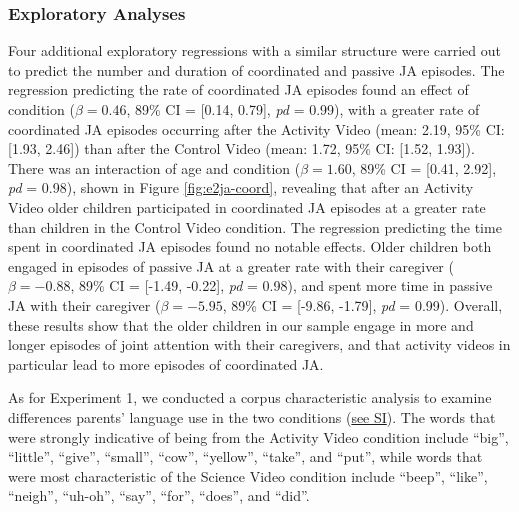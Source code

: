 \documentclass[
  english,
  man]{apa6}
\begin{document}
\hypertarget{exploratory-analyses-1}{%
\subsubsection{Exploratory Analyses}\label{exploratory-analyses-1}}

Four additional exploratory regressions with a similar structure were carried out to predict the number and duration of coordinated and passive JA episodes.
The regression predicting the rate of coordinated JA episodes found an effect of condition (\(\beta=0.46\), 89\% CI = {[}0.14, 0.79{]}, \emph{pd} = 0.99), with a greater rate of coordinated JA episodes occurring after the Activity Video (mean: 2.19, 95\% CI: {[}1.93, 2.46{]}) than after the Control Video (mean: 1.72, 95\% CI: {[}1.52, 1.93{]}).
There was an interaction of age and condition (\(\beta=1.60\), 89\% CI = {[}0.41, 2.92{]}, \emph{pd} = 0.98), shown in Figure \ref{fig:e2ja-coord}, revealing that after an Activity Video older children participated in coordinated JA episodes at a greater rate than children in the Control Video condition.
The regression predicting the time spent in coordinated JA episodes found no notable effects.
Older children both engaged in episodes of passive JA at a greater rate with their caregiver (\(\beta=-0.88\), 89\% CI = {[}-1.49, -0.22{]}, \emph{pd} = 0.98), and spent more time in passive JA with their caregiver (\(\beta=-5.95\), 89\% CI = {[}-9.86, -1.79{]}, \emph{pd} = 0.99).
Overall, these results show that the older children in our sample engage in more and longer episodes of joint attention with their caregivers, and that activity videos in particular lead to more episodes of coordinated JA.

As for Experiment 1, we conducted a corpus characteristic analysis to examine differences parents' language use in the two conditions (\href{https://cogsciguy.github.io/parenting_obs_language/Exp2_characteristic_chart.html}{see SI}).
The words that were strongly indicative of being from the Activity Video condition include \enquote{big}, \enquote{little}, \enquote{give}, \enquote{small}, \enquote{cow}, \enquote{yellow}, \enquote{take}, and \enquote{put}, while words that were most characteristic of the Science Video condition include \enquote{beep}, \enquote{like}, \enquote{neigh}, \enquote{uh-oh}, \enquote{say}, \enquote{for}, \enquote{does}, and \enquote{did}.
\end{document}
